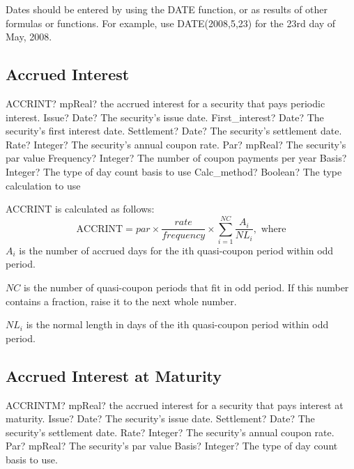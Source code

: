 \vspace{0.3cm}
Dates should be entered by using the DATE function, or as results of other formulas or functions. For example, use DATE(2008,5,23) for the 23rd day of May, 2008. 


\subsection{Accrued Interest}

\begin{mpFunctionsExtract}
	\mpWorksheetFunctionEightNotImplemented
	{ACCRINT? mpReal? the accrued interest for a security that pays periodic interest.}
	{Issue? Date? The security's issue date.}
	{First\_interest? Date? The security's first interest date.}
	{Settlement? Date?  The security's settlement date.}
	{Rate? Integer?  The security's annual coupon rate.}
	{Par? mpReal? The security's par value}
	{Frequency? Integer? The number of coupon payments per year}
	{Basis? Integer?  The type of day count basis to use}
	{Calc\_method? Boolean?  The type calculation to use}
\end{mpFunctionsExtract}

\vspace{0.3cm}
ACCRINT is calculated as follows: 
\begin{equation}
\text{ACCRINT} = par \times \frac{rate}{frequency} \times \sum_{i=1}^{NC} \frac{A_i}{NL_i}, \text{ where}
\end{equation}
$A_i$ is the number of accrued days for the ith quasi-coupon period within odd period.

$NC$ is the number of quasi-coupon periods that fit in odd period. If this number contains a fraction, raise it to the next whole number.

$NL_i$ is the normal length in days of the ith quasi-coupon period within odd period.




\subsection{Accrued Interest at Maturity}

\begin{mpFunctionsExtract}
	\mpWorksheetFunctionFiveNotImplemented
	{ACCRINTM? mpReal? the accrued interest for a security that pays interest at maturity.}
	{Issue? Date? The security's issue date.}
	{Settlement? Date?  The security's settlement date.}
	{Rate? Integer?  The security's annual coupon rate.}
	{Par? mpReal? The security's par value}
	{Basis? Integer? The type of day count basis to use.}
\end{mpFunctionsExtract}

